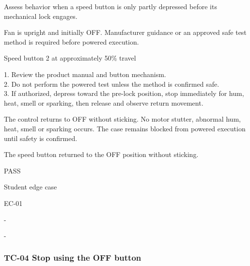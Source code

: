 \begin{description}[style=nextline,leftmargin=3.2cm]

\item[Objective] Assess behavior when a speed button is only partly depressed before its mechanical lock engages.

\item[Preconditions] Fan is upright and initially OFF. Manufacturer guidance or an approved safe test method is required before powered execution.

\item[Input] Speed button 2 at approximately 50\% travel

\item[Steps] 1. Review the product manual and button mechanism.\\ 2. Do not perform the powered test unless the method is confirmed safe.\\ 3. If authorized, depress toward the pre-lock position, stop immediately for hum, heat, smell or sparking, then release and observe return movement.

\item[Expected] The control returns to OFF without sticking. No motor stutter, abnormal hum, heat, smell or sparking occurs. The case remains blocked from powered execution until safety is confirmed.

\item[Actual] The speed button returned to the OFF position without sticking.

\item[Verdict] PASS

\item[Source] Student edge case

\item[Edge case] EC-01

\item[Video] -

\item[Issue] -

\end{description}

\clearpage

\subsubsection{TC-04 Stop using the OFF button}


